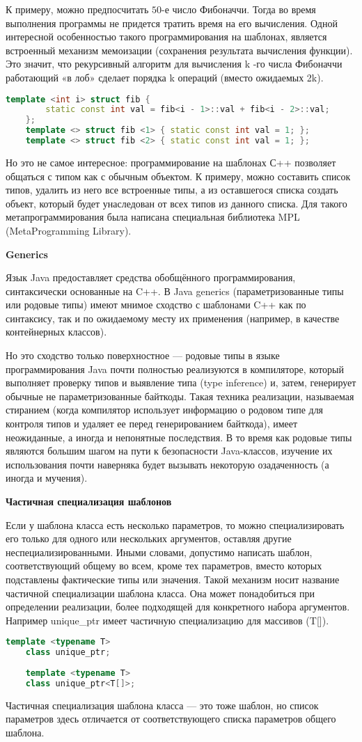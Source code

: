 К примеру, можно предпосчитать $50$-е число Фибоначчи. Тогда во время выполнения программы не придется тратить время на его вычисления. Одной интересной особенностью такого программирования на шаблонах, является встроенный механизм мемоизации (сохранения результата вычисления функции). Это значит, что рекурсивный алгоритм для вычисления k -го числа Фибоначчи работающий «в лоб» сделает порядка k операций (вместо ожидаемых 2k).

\begin{lstlisting}[language=C++]
	template <int i> struct fib { 
		static const int val = fib<i - 1>::val + fib<i - 2>::val;
	};
	template <> struct fib <1> { static const int val = 1; };
	template <> struct fib <2> { static const int val = 1; };
\end{lstlisting}

Но это не самое интересное: программирование на шаблонах С++ позволяет общаться с типом как с обычным объектом. К примеру, можно составить список типов, удалить из него все встроенные типы, а
из оставшегося списка создать объект, который будет унаследован от всех типов из данного списка. Для такого метапрограммирования была написана специальная библиотека MPL (MetaProgramming Library).

\textbf{Generics}

Язык Java предоставляет средства обобщённого программирования, синтаксически основанные на C++. В Java generics (параметризованные типы или родовые типы) имеют мнимое сходство с шаблонами C++ как
по синтаксису, так и по ожидаемому месту их применения (например, в качестве контейнерных классов).

Но это сходство только поверхностное — родовые типы в языке программирования Java почти полностью реализуются в компиляторе, который выполняет проверку типов и выявление типа (type inference)
и, затем, генерирует обычные не параметризованные байткоды. Такая техника реализации, называемая стиранием (когда компилятор использует информацию о родовом типе для контроля типов и удаляет ее перед генерированием байткода), имеет неожиданные, а иногда и непонятные последствия. В то время как родовые типы являются большим шагом на пути к безопасности Java-классов, изучение их использования почти наверняка будет вызывать некоторую озадаченность (а иногда и мучения).

\textbf{Частичная специализация шаблонов}

Если у шаблона класса есть несколько параметров, то можно специализировать его только для одного или нескольких аргументов, оставляя другие неспециализированными. Иными словами, допустимо написать шаблон, соответствующий общему во всем, кроме тех параметров, вместо которых подставлены фактические типы или значения. Такой механизм носит название частичной специализации шаблона класса. Она может понадобиться при определении реализации, более подходящей для конкретного набора аргументов. Например unique\_ptr имеет частичную специализацию для массивов (T[]).

\begin{lstlisting}[language=C++]
	template <typename T>
	class unique_ptr;
	
	template <typename T>
	class unique_ptr<T[]>;
\end{lstlisting}
Частичная специализация шаблона класса — это тоже шаблон, но список параметров здесь отличается от соответствующего списка параметров общего шаблона.
